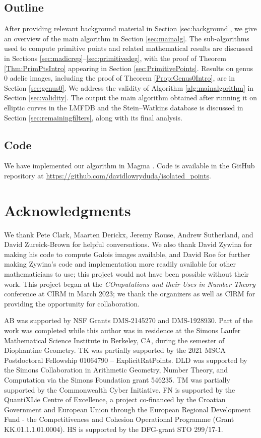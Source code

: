 \documentclass[11pt,reqno]{amsart}
\theoremstyle{plain}
\theoremstyle{definition}
\begin{document}
\subsection{Outline}
After providing relevant background material in Section \ref{sec:background}, we give an overview of the main algorithm in Section \ref{sec:mainalg}. The sub-algorithms used to compute primitive points and related mathematical results are discussed in Sections \ref{sec:madicrep}--\ref{sec:primitivedeg}, with the proof of Theorem \ref{Thm:PrimPtsIntro} appearing in Section \ref{sec:PrimitivePoints}. Results on genus 0 adelic images, including the proof of Theorem \ref{Prop:Genus0Intro}, are in Section \ref{sec:genus0}.  We address the validity of Algorithm \ref{alg:mainalgorithm} in Section \ref{sec:validity}. The output the main algorithm obtained after running it on elliptic curves in the LMFDB and the Stein--Watkins database is discussed in Section \ref{sec:remainingfilters}, along with its final analysis.

\subsection{Code} We have implemented our algorithm in Magma \cite{Magma}. Code is available in the GitHub repository at \url{https://github.com/davidlowryduda/isolated_points}.

\section*{Acknowledgments}
We thank Pete Clark, Maarten Derickx, Jeremy Rouse, Andrew Sutherland, and David Zureick-Brown for helpful conversations. We also thank David Zywina for making his code to compute Galois images available, and David Roe for further making Zywina's code and implementation more readily available for other mathematicians to use; this project would not have been possible without their work. This project began at the \emph{COmputations and their Uses in Number Theory} conference at CIRM in March 2023; we thank the organizers as well as CIRM for providing the opportunity for collaboration.

AB was supported by NSF Grants DMS-2145270 and DMS-1928930. Part of the work was completed while this author was in residence at the Simons Laufer Mathematical Science Institute in Berkeley, CA, during the semester of Diophantine Geometry. TK was partially supported by the 2021 MSCA Postdoctoral Fellowship 01064790 -- ExplicitRatPoints. DLD was supported by the Simons Collaboration in Arithmetic Geometry, Number Theory, and Computation via the Simons Foundation grant 546235. TM was partially supported by the Commonwealth Cyber Initiative. FN is supported by the QuantiXLie Centre of Excellence, a
  project co-financed by the Croatian Government and European Union
  through the European Regional Development Fund - the Competitiveness
  and Cohesion Operational Programme (Grant KK.01.1.1.01.0004). HS is supported by the DFG-grant STO 299/17-1.
\end{document}
